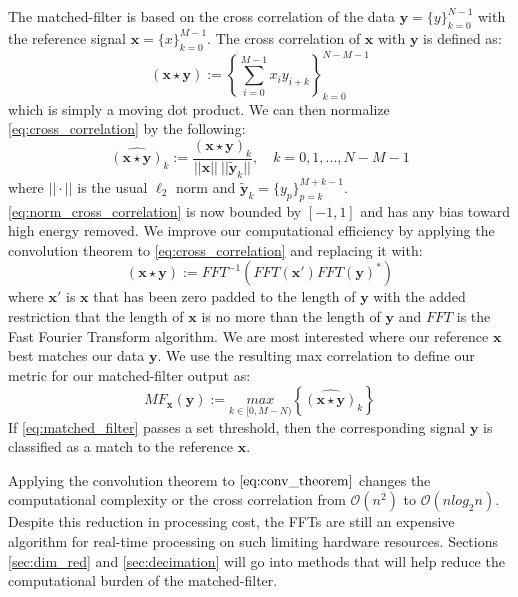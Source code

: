 \documentclass[conference]{IEEEtran}
\begin{document}
The matched-filter is based on the cross correlation of the data $\textbf{y} = \{y\}_{k=0}^{N-1}$ with the reference signal $\textbf{x} = \{x\}_{k=0}^{M-1}$.
The cross correlation of $\textbf{x}$ with $\textbf{y}$ is defined as:
%
\begin{equation} \label{eq:cross_correlation}
(\textbf{x} \star \textbf{y}) := \left \{\sum_{i=0}^{M-1}x_{i} y_{i+k} \right \}_{k=0}^{N-M-1}
\end{equation}
%
which is simply a moving dot product.
We can then normalize \eqref{eq:cross_correlation} by the following:
%
\begin{equation} \label{eq:norm_cross_correlation}
\widehat{(\textbf{x} \star \textbf{y})}_k := \frac{(\textbf{x} \star \textbf{y})_k}{||\textbf{x}|| \ || \widetilde{\textbf{y}}_k || }, \quad k = 0,1,...,N-M-1
\end{equation}
%
where $|| \cdot ||$ is the usual $\ell_2$ norm and $\widetilde{\textbf{y}}_k = \{y_p\}_{p=k}^{M+k-1}$.
\eqref{eq:norm_cross_correlation} is now bounded by $[-1,1]$ and has any bias toward high energy removed.
We improve our computational efficiency by applying the convolution theorem to \eqref{eq:cross_correlation} and replacing it with:
%
\begin{equation} \label{eq:conv_theorem}
(\textbf{x} \star \textbf{y}) := FFT^{-1}(FFT(\textbf{x}') FFT(\textbf{y})^*)
\end{equation}
%
where $\textbf{x}'$ is $\textbf{x}$ that has been zero padded to the length of $\textbf{y}$ with the added restriction that the length of $\textbf{x}$ is no more than the length of $\textbf{y}$ and $FFT$ is the Fast Fourier Transform algorithm.
We are most interested where our reference $\textbf{x}$ best matches our data $\textbf{y}$.
We use the resulting max correlation to define our metric for  our matched-filter output as:
%
\begin{equation} \label{eq:matched_filter}
MF_{\textbf{x}}(\textbf{y}) := \underset{k \in [0, M-N)}{max} \left \{\widehat{(\textbf{x} \star \textbf{y})}_k \right \}
\end{equation}
%
If \eqref{eq:matched_filter} passes a set threshold, then the corresponding signal $\textbf{y}$ is classified as a match to the reference $\textbf{x}$.

Applying the convolution theorem to $\eqref{eq:conv_theorem}$ changes the computational complexity or the cross correlation from $\mathcal{O}(n^2)$ to $\mathcal{O}(n log_2n)$.
Despite this reduction in processing cost, the FFTs are still an expensive algorithm for real-time processing on such limiting hardware resources. Sections \ref{sec:dim_red} and \ref{sec:decimation} will go into methods that will help reduce the computational burden of the matched-filter.
%
\end{document}
